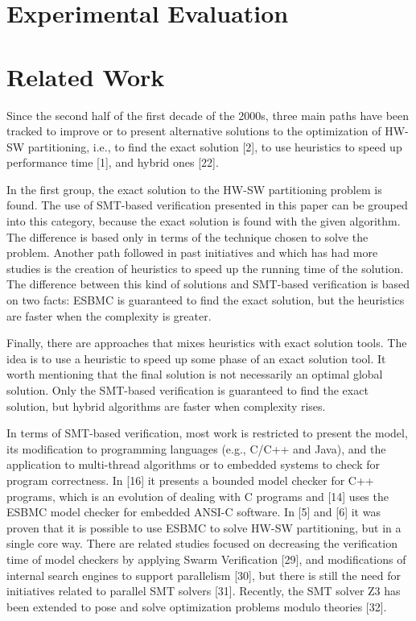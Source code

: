 \section{Experimental Evaluation}


\section{Related Work}
Since the second half of the first decade of the 2000s, three main paths have been tracked to improve or to present alternative solutions to the optimization of HW-SW partitioning, i.e., to find the exact solution [2], to use heuristics to speed up performance time [1], and hybrid ones [22].

In the first group, the exact solution to the HW-SW partitioning problem is found. The use of SMT-based verification presented in this paper can be grouped into this category, because the exact solution is found with the given algorithm. The difference is based only in terms of the technique chosen to solve the problem.
Another path followed in past initiatives and which has had more studies is the creation of heuristics to speed up the running time of the solution. The difference between this kind of solutions and SMT-based verification is based on two facts: ESBMC is guaranteed to find the exact solution, but the heuristics are faster when the complexity is greater.

Finally, there are approaches that mixes heuristics with exact solution tools. The idea is to use a heuristic to speed up some phase of an exact solution tool. It worth mentioning that the final solution is not necessarily an optimal global solution. Only the SMT-based verification is guaranteed to find the exact solution, but hybrid algorithms are faster when complexity rises.

In terms of SMT-based verification, most work is restricted to present the model, its modification to programming languages (e.g., C/C++ and Java), and the application to multi-thread algorithms or to embedded systems to check for program correctness. In [16] it presents a bounded model checker for C++ programs, which is an evolution of dealing with C programs and [14] uses the ESBMC model checker for embedded ANSI-C software. In [5] and [6] it was proven that it is possible to use ESBMC to solve HW-SW partitioning, but in a single core way. There are related studies focused on decreasing the verification time of model checkers by applying Swarm Verification [29], and modifications of internal search engines to support parallelism [30], but there is still the need for initiatives related to parallel SMT solvers [31]. Recently, the SMT solver Z3 has been extended to pose and solve optimization problems modulo theories [32].
